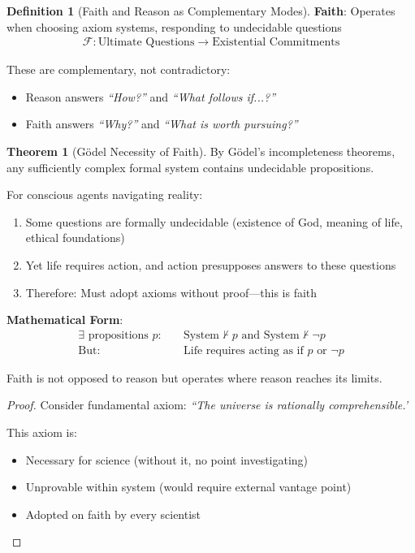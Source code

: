 \documentclass[11pt,a4paper]{article}
\theoremstyle{definition}
\newtheorem{definition}{Definition}[section]
\newtheorem{theorem}{Theorem}[section]
\theoremstyle{remark}
\begin{document}
\begin{enumerate}
\begin{definition}[Faith and Reason as Complementary Modes]
\textbf{Faith}: Operates when choosing axiom systems, responding to undecidable questions
\begin{align}
\mathcal{F}: \text{Ultimate Questions} \to \text{Existential Commitments}
\end{align}

These are complementary, not contradictory:
\begin{itemize}
    \item Reason answers \textit{``How?''} and \textit{``What follows if...?''}
    \item Faith answers \textit{``Why?''} and \textit{``What is worth pursuing?''}
\end{itemize}
\end{definition}

\begin{theorem}[Gödel Necessity of Faith]
By Gödel's incompleteness theorems, any sufficiently complex formal system contains undecidable propositions.

For conscious agents navigating reality:
\begin{enumerate}
    \item Some questions are formally undecidable (existence of God, meaning of life, ethical foundations)
    \item Yet life requires action, and action presupposes answers to these questions
    \item Therefore: Must adopt axioms without proof—this is faith
\end{enumerate}

\textbf{Mathematical Form}:
\begin{align}
\exists \text{ propositions } p: \quad &\text{System} \nvdash p \text{ and } \text{System} \nvdash \neg p \\
\text{But: } &\text{Life requires acting as if } p \text{ or } \neg p
\end{align}

Faith is not opposed to reason but operates where reason reaches its limits.
\end{theorem}

\begin{proof}
Consider fundamental axiom: \textit{``The universe is rationally comprehensible.'}

This axiom is:
\begin{itemize}
    \item Necessary for science (without it, no point investigating)
    \item Unprovable within system (would require external vantage point)
    \item Adopted on faith by every scientist
\end{itemize}


\end{proof}
\end{enumerate}
\end{document}
